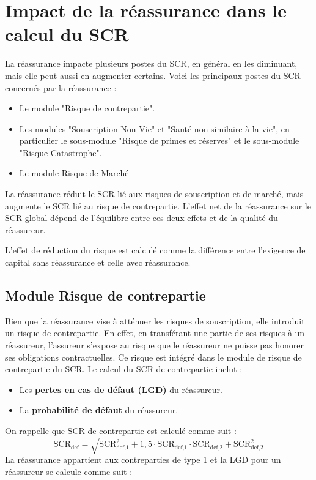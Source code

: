 \section*{Impact de la réassurance dans le calcul du SCR}

La réassurance impacte plusieurs postes du SCR, en général en les diminuant, mais elle peut aussi en augmenter certains. Voici les principaux postes du SCR concernés par la réassurance :
\begin{itemize}
    \item Le module "Risque de contrepartie".
    \item Les modules "Souscription Non-Vie" et "Santé non similaire à la vie", en particulier le sous-module "Risque de primes et réserves" et le sous-module "Risque Catastrophe".
    \item Le module Risque de Marché
\end{itemize}
La réassurance réduit le SCR lié aux risques de souscription et de marché, mais augmente le SCR lié au risque de contrepartie. L'effet net de la réassurance sur le SCR global dépend de l'équilibre entre ces deux effets et de la qualité du réassureur. 


L'effet de réduction du risque est calculé comme la différence entre l'exigence de capital sans réassurance et celle avec réassurance. 

\subsection*{Module Risque de contrepartie}

Bien que la réassurance vise à atténuer les risques de souscription, elle introduit un risque de contrepartie. En effet, en transférant une partie de ses risques à un réassureur, l'assureur s'expose au risque que le réassureur ne puisse pas honorer ses obligations contractuelles. Ce risque est intégré dans le module de risque de contrepartie du SCR.
Le calcul du SCR de contrepartie inclut :
        \begin{itemize}
            \item Les \textbf{pertes en cas de défaut (LGD)} du réassureur.
            \item La \textbf{probabilité de défaut} du réassureur.
        \end{itemize}
On rappelle que SCR de contrepartie est calculé comme suit :
        \[
        \text{SCR}_{\text{def}} = \sqrt{\text{SCR}^2_{\text{def,1}} + 1,5 \cdot \text{SCR}_{\text{def,1}} \cdot \text{SCR}_{\text{def,2}} + \text{SCR}^2_{\text{def,2}}}
        \]
La réassurance appartient aux contreparties de type 1 et la LGD pour un réassureur se calcule comme suit : 

